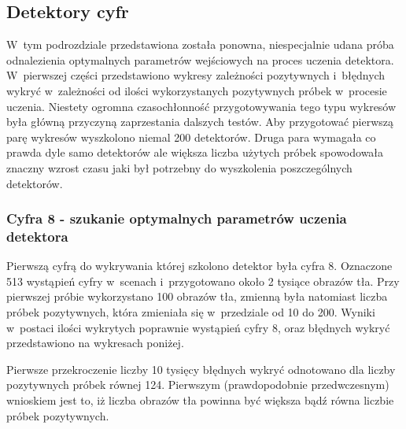 \subsection{Detektory cyfr}

W~tym podrozdziale przedstawiona została ponowna,
niespecjalnie udana próba odnalezienia optymalnych
parametrów wejściowych na proces uczenia detektora.
W~pierwszej części przedstawiono wykresy zależności pozytywnych
i~błędnych wykryć w~zależności od ilości wykorzystanych
pozytywnych próbek w~procesie uczenia. Niestety
ogromna czasochłonność przygotowywania tego typu wykresów
była główną przyczyną zaprzestania dalszych testów.
Aby przygotować pierwszą parę wykresów wyszkolono niemal 200 detektorów.
Druga para wymagała co prawda dyle samo detektorów ale większa 
liczba użytych próbek spowodowała znaczny wzrost czasu jaki był 
potrzebny do wyszkolenia poszczególnych detektorów.

\subsubsection{Cyfra 8 - szukanie optymalnych parametrów uczenia detektora}

Pierwszą cyfrą do wykrywania której szkolono detektor była cyfra 8.
Oznaczone 513 wystąpień cyfry w~scenach i~przygotowano około 2 tysiące
obrazów tła. Przy pierwszej próbie wykorzystano 100 obrazów tła, zmienną
była natomiast liczba próbek pozytywnych, która zmieniała się w~przedziale
od 10 do 200. Wyniki w~postaci ilości wykrytych poprawnie wystąpień cyfry
8, oraz błędnych wykryć przedstawiono na wykresach poniżej.

\begin{center}
\end{center}

Pierwsze przekroczenie liczby 10 tysięcy błędnych wykryć odnotowano dla
liczby pozytywnych próbek równej 124. Pierwszym (prawdopodobnie przedwczesnym)
wnioskiem jest to, iż liczba obrazów tła powinna być
większa bądź równa liczbie próbek pozytywnych.

